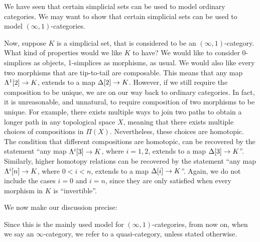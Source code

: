 We have seen that certain simplicial sets can be used to model ordinary categories. We may want to show that certain simplicial sets can 
be used to model $(\infty,1)$-categories. 

Now, suppose $K$ is a simplicial set, that is considered to be an $(\infty,1)$-category. 
What kind of properties would we like $K$ to have? We would like to consider 0-simplices as objects, 1-simplices as morphisms, as usual.
We would also like every two morphisms that are tip-to-tail are composable. This means that any map $\Lambda^1[2]\to K$, extends to a map $\Delta[2]\to K$.
However, if we still require the composition to be unique, we are on our way back to ordinary categories. In fact, it is unreasonable,
and unnatural, to require composition of two morphisms to be unique. For example, there exists multiple ways to join two paths 
to obtain a longer path in any topological space $X$, meaning that there exists multiple choices of compositions in $\Pi(X)$. Nevertheless,
these choices are homotopic. The condition that different compositions are homotopic, can be recovered by the statement
``any map $\Lambda^i[3]\to K$, where $i=1,2$, extends to a map $\Delta[3]\to K$''. Similarly, higher homotopy relations can be recovered by the statement
``any map $\Lambda^i[n]\to K$, where $0<i<n$, extends to a map $\Delta[i]\to K$''. Again, we do not include the cases $i=0$ and $i=n$,
since they are only satisfied when every morphism in $K$ is ``invertible''. 

We now make our discussion precise:


Since this is the mainly used model for $(\infty,1)$-categories, from now on, when we say an $\infty$-category, we refer to a quasi-category,
unless stated otherwise.


